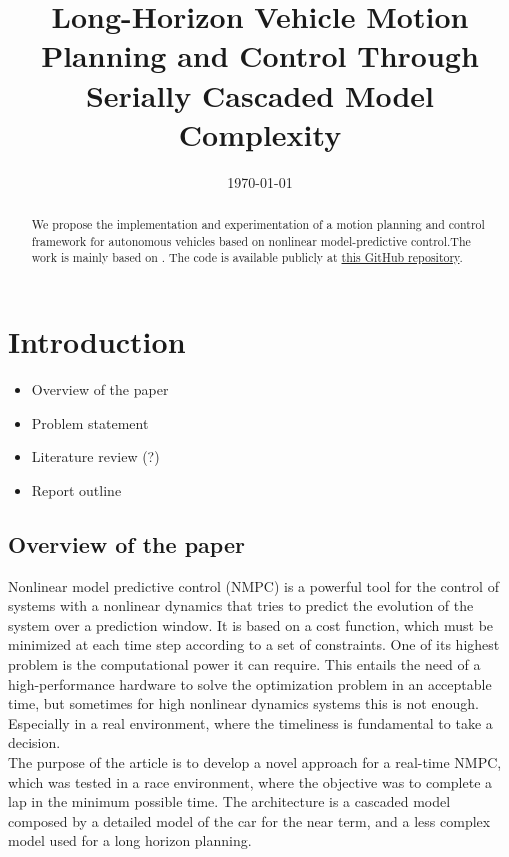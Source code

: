 \documentclass[a4paper, twocolumn, 11pt, twoside]{article}
\title{Long-Horizon Vehicle Motion Planning and Control Through Serially Cascaded Model Complexity}
\author{}
\date{\today}
\begin{document}
\maketitle

\begin{abstract}
    We propose the implementation and experimentation of a motion planning and
    control framework for autonomous vehicles based on nonlinear
    model-predictive control.The work is mainly based on \cite{paper}. The code is available publicly at
    \href{https://github.com/neverorfrog/vehicle-control}{this GitHub
    repository}. 
\end{abstract}


\section{Introduction}

\begin{itemize}
    \item Overview of the paper
    \item Problem statement
    \item Literature review (?)
    \item Report outline
\end{itemize}

\subsection*{Overview of the paper}


Nonlinear model predictive control (NMPC) is a powerful tool for the control of systems with a nonlinear dynamics 
that tries to predict the evolution of the system over a prediction window. It is based on a cost function, which must
be minimized at each time step according to a set of constraints.
One of its highest problem is the computational power it can require. This entails the need of a high-performance hardware
to solve the optimization problem in an acceptable time, but sometimes for high nonlinear dynamics systems this is not enough.
Especially in a real environment, where the timeliness is fundamental to take a decision.\\
The purpose of the article is to develop a novel approach for a real-time NMPC, which was tested in a race environment, where the 
objective was to complete a lap in the minimum possible time. The architecture is a cascaded model composed by a detailed model
of the car for the near term, and a less complex model used for a long horizon planning.
\end{document}
